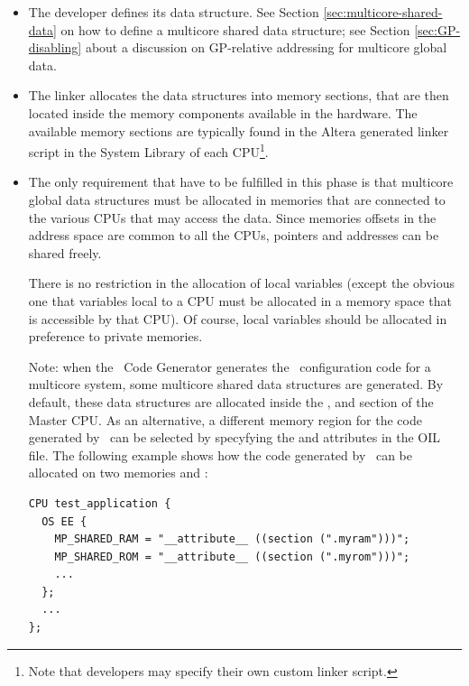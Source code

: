 \begin{itemize}
\item The developer defines its data structure.  See Section
  \ref{sec:multicore-shared-data} on how to define a
  multicore shared data structure; see Section
  \ref{sec:GP-disabling} about a discussion on GP-relative
  addressing for multicore global data.

\item The linker allocates the data structures into memory sections,
  that are then located inside the memory components available in the
  hardware. The available memory sections are typically found in the
  Altera generated linker script in the System Library of each
  CPU\footnote{Note that developers may specify their own custom
  linker script.}.

\item The only requirement that have to be fulfilled in this phase is
  that multicore global data structures must be allocated in
  memories that are connected to the various CPUs that may access the
  data. Since memories offsets in the address space are common to all
  the CPUs, pointers and addresses can be shared freely.

  There is no restriction in the allocation of local variables (except
  the obvious one that variables local to a CPU must be allocated in a
  memory space that is accessible by that CPU). Of course, local
  variables should be allocated in preference to private memories.

  Note: when the \rtd\ Code Generator generates the \ee\ configuration
  code for a multicore system, some multicore shared data
  structures are generated. By default, these data structures are
  allocated inside the ,  and
   section of the Master CPU. As an alternative, a
  different memory region for the code generated by \rtd\ can be
  selected by specyfying the  and
   attributes in the OIL file. The following
  example shows how the code generated by \rtd\ can be allocated on
  two memories  and :

\begin{lstlisting}
CPU test_application {
  OS EE {
    MP_SHARED_RAM = "__attribute__ ((section (".myram")))";
    MP_SHARED_ROM = "__attribute__ ((section (".myrom")))";
    ...
  };
  ...
};
\end{lstlisting}



\end{itemize}
